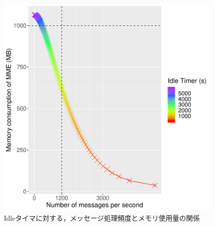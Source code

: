 \documentclass[a4j]{ujarticle}
\begin{document}
\begin{figure}[htbp]
  \centering
  \includegraphics[width=0.5\hsize]{theory_1_all_30s_theory.pdf}
  \caption{Idleタイマに対する，メッセージ処理頻度とメモリ使用量の関係}
  \label{theory_1_all_30s_theory}
\end{figure}
\end{document}

